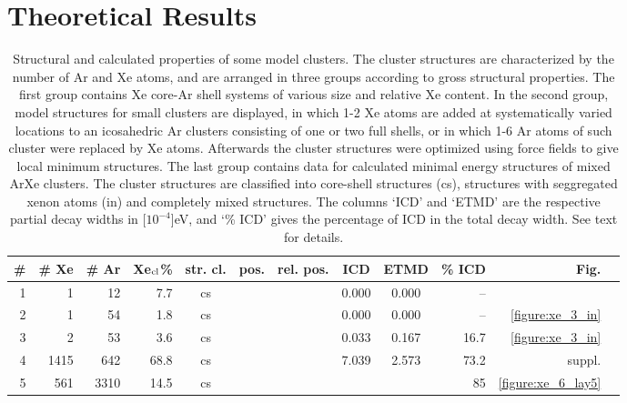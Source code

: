 \section{Theoretical Results
\label{sec:th_results}}
%
%
\begin{table}[h]
\small
\centering
\caption{Structural and calculated properties of some model clusters.
The cluster structures are characterized by the number of Ar and Xe atoms,
and are arranged in three groups according to gross structural properties. 
The first group contains Xe core-Ar shell systems of various
size and relative Xe content.
In the second group, model structures for small clusters are displayed,
in which 1-2 Xe atoms are added at systematically varied locations
to an icosahedric Ar clusters consisting of one or two full shells,
or in which 1-6 Ar atoms of such cluster were replaced by Xe atoms.
Afterwards the cluster structures were optimized using force fields to
give local minimum structures.
The last group contains data for calculated minimal energy structures
of mixed ArXe clusters.\protect\cite{marques}
The cluster structures are classified into core-shell structures (cs),
structures with seggregated xenon atoms (in) and completely mixed
structures.
The columns `ICD' and `ETMD' are the respective partial decay widths
in \unit[$10^{-4}$]{eV}, and `\% ICD' gives the percentage of ICD in
the total decay width.
See text for details.
\label{table:theo_gammas}
}
\begin{tabular}{rrrrcccccrrr}
\toprule
\# & \# Xe & \# Ar & Xe$_{\rm cl}$\% & str. cl. & pos. & rel. pos. & ICD   &  ETMD & \% ICD & Fig.\\ %
\midrule
 1 &     1 &    12 &  7.7  & cs    &         &          & 0.000 & 0.000 &  -- &\\ %
 2 &     1 &    54 &  1.8  & cs    &         &          & 0.000 & 0.000 &  -- & \ref{figure:xe_3_in}\\ %
 3 &     2 &    53 &  3.6  & cs    &         &          & 0.033 & 0.167 &  16.7& \ref{figure:xe_3_in}\\ %
 4 &  1415 &   642 & 68.8  & cs    &         &          & 7.039 & 2.573 &  73.2& suppl.\\ %
 5 &   561 &  3310 & 14.5  & cs    &         &          &       &       &  85  & \ref{figure:xe_6_lay5}\\ %
 

\end{tabular}
\end{table}
